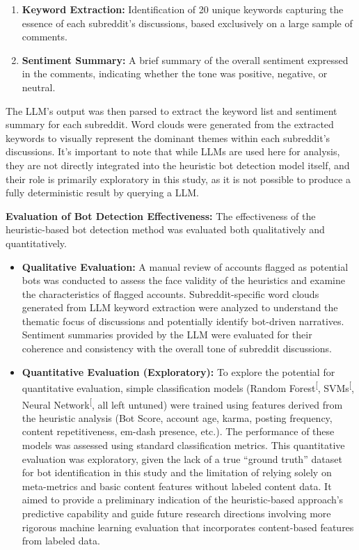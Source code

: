 \documentclass[
  12pt,
  letterpaper,
  DIV=11,
  numbers=noendperiod]{scrartcl}
\providecommand{\tightlist}{%
  \setlength{\itemsep}{0pt}\setlength{\parskip}{0pt}}\usepackage{longtable,booktabs,array}
\begin{document}
\begin{enumerate}
\def\labelenumi{\arabic{enumi}.}
\tightlist
\item
  \textbf{Keyword Extraction:} Identification of 20 unique keywords
  capturing the essence of each subreddit's discussions, based
  exclusively on a large sample of comments.
\item
  \textbf{Sentiment Summary:} A brief summary of the overall sentiment
  expressed in the comments, indicating whether the tone was positive,
  negative, or neutral.
\end{enumerate}

The LLM's output was then parsed to extract the keyword list and
sentiment summary for each subreddit. Word clouds were generated from
the extracted keywords to visually represent the dominant themes within
each subreddit's discussions. It's important to note that while LLMs are
used here for analysis, they are not directly integrated into the
heuristic bot detection model itself, and their role is primarily
exploratory in this study, as it is not possible to produce a fully
deterministic result by querying a LLM.

\textbf{Evaluation of Bot Detection Effectiveness:} The effectiveness of
the heuristic-based bot detection method was evaluated both
qualitatively and quantitatively.

\begin{itemize}
\item
  \textbf{Qualitative Evaluation:} A manual review of accounts flagged
  as potential bots was conducted to assess the face validity of the
  heuristics and examine the characteristics of flagged accounts.
  Subreddit-specific word clouds generated from LLM keyword extraction
  were analyzed to understand the thematic focus of discussions and
  potentially identify bot-driven narratives. Sentiment summaries
  provided by the LLM were evaluated for their coherence and consistency
  with the overall tone of subreddit discussions.
\item
  \textbf{Quantitative Evaluation (Exploratory):} To explore the
  potential for quantitative evaluation, simple classification models
  (Random
  Forest\textsuperscript{{[}\citeproc{ref-breiman2001random}{5}{]}},
  SVMs\textsuperscript{{[}\citeproc{ref-cortes1995support}{27}{]}},
  Neural
  Network\textsuperscript{{[}\citeproc{ref-lecun2015deep}{28}{]}}, all
  left untuned) were trained using features derived from the heuristic
  analysis (Bot Score, account age, karma, posting frequency, content
  repetitiveness, em-dash presence, etc.). The performance of these
  models was assessed using standard classification metrics. This
  quantitative evaluation was exploratory, given the lack of a true
  ``ground truth'' dataset for bot identification in this study and the
  limitation of relying solely on meta-metrics and basic content
  features without labeled content data. It aimed to provide a
  preliminary indication of the heuristic-based approach's predictive
  capability and guide future research directions involving more
  rigorous machine learning evaluation that incorporates content-based
  features from labeled data.
\end{itemize}
\end{document}
